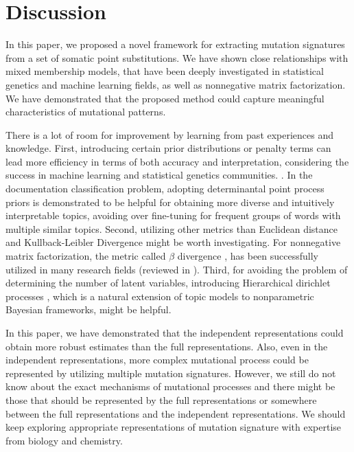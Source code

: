\section*{Discussion}


In this paper, we proposed a novel framework for extracting mutation signatures from a set of somatic point substitutions.
We have shown close relationships with mixed membership models, 
that have been deeply investigated in statistical genetics and machine learning fields, as well as nonnegative matrix factorization.
We have demonstrated that the proposed method could capture meaningful characteristics of mutational patterns.

There is a lot of room for improvement by learning from past experiences and knowledge.
First, introducing certain prior distributions or penalty terms can lead more efficiency in terms of both accuracy and interpretation,
considering the success in machine learning and statistical genetics communities.
\cite{hoyer2004non, engelhardt2010analysis}.
In the documentation classification problem, 
adopting determinantal point process priors \cite{kulesza2012determinantal, kwok2012priors}
is demonstrated to be helpful for obtaining more diverse and intuitively interpretable topics,
avoiding over fine-tuning for frequent groups of words with multiple similar topics.
Second, utilizing other metrics than Euclidean distance and Kullback-Leibler Divergence might be worth investigating.
For nonnegative matrix factorization, 
the metric called $\beta$ divergence \cite{basu1998robust, eguchi2001robustifying}, 
has been successfully utilized in many research fields (reviewed in \cite{fevotte2011algorithms}).
Third, for avoiding the problem of determining the number of latent variables, 
introducing Hierarchical dirichlet processes \cite{teh2006hierarchical}, 
which is a natural extension of topic models to nonparametric Bayesian frameworks, might be helpful.


In this paper, we have demonstrated that the independent representations could obtain more robust estimates than the full representations.
Also, even in the independent representations, more complex mutational process could be represented by utilizing multiple mutation signatures.
However, we still do not know about the exact mechanisms of mutational processes and 
there might be those that should be represented by the full representations or somewhere between the full representations and the independent representations.
We should keep exploring appropriate representations of mutation signature with expertise from biology and chemistry.


